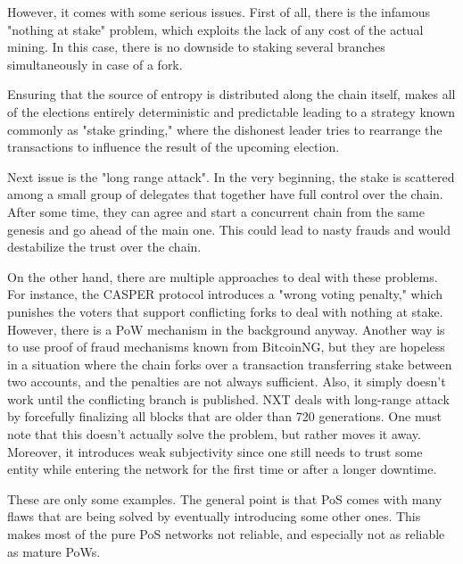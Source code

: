 However, it comes with some serious issues. First of all, there is the infamous "nothing at stake"
\cite{pos_flaws_nothing}
problem, which exploits the lack of any cost of the actual mining. In this case,
there is no downside to staking several branches simultaneously in case of a fork.

Ensuring that the source of entropy is distributed along the chain itself,
makes all of the elections entirely deterministic and predictable leading to a strategy
known commonly as "stake grinding," where the dishonest leader tries to rearrange the
transactions to influence the result of the upcoming election.

Next issue is the "long range attack"\cite{pos_flaws_long}.
In the very beginning, the stake is scattered among a small
group of delegates that together have full control over the chain. After
some time, they can agree and start a concurrent chain from the same genesis
and go ahead of the main one. This could lead to nasty frauds and would
destabilize the trust over the chain.

On the other hand, there are multiple approaches to deal with these problems. For instance,
the CASPER protocol introduces a "wrong voting penalty," which punishes the
voters that support conflicting forks to deal with nothing at stake\cite{casper}.
However, there is a PoW mechanism in the background anyway. Another way is to use
proof of fraud mechanisms known from BitcoinNG\cite{bcng},
but they are hopeless in a situation where the chain forks over a transaction
transferring stake between two accounts, and the penalties are not always
sufficient. Also, it simply doesn't work until the
conflicting branch is published. NXT deals with long-range attack by forcefully
finalizing all blocks that are older than 720 generations\cite{nxt}.
One must note that this doesn't actually solve the problem, but rather moves it
away. Moreover, it introduces weak subjectivity since one still needs to trust
some entity while entering the network for the first time or after a longer downtime.

These are only some examples. The general point is that PoS comes with many flaws
that are being solved by eventually introducing some other ones. This
makes most of the pure PoS networks not reliable, and especially not as reliable
as mature PoWs.
